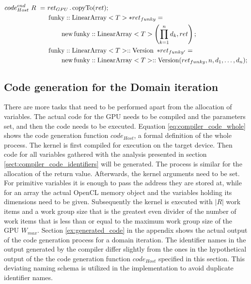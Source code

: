 \begin{align}
\label{eq:compiler_code_return_2}
code_{Host}^{end}\ R \ = 	&\ ret_{GPU}\operatorname{.copyTo}(ret);\\
				 	&\ \operatorname{funky}::\operatorname{LinearArray}<T> *ret_{funky} = \notag\\
				 	&\ \qquad \operatorname{new} \operatorname{funky}::\operatorname{LinearArray}<T>\left(\prod_{k=1}^n d_k,ret\right); \notag\\
            		&\ \operatorname{funky}::\operatorname{LinearArray}<T>::\operatorname{Version}\ * ret_{funky'} = \notag\\
            		&\ \qquad \operatorname{new} \operatorname{funky}::\operatorname{LinearArray}<T>::\operatorname{Version}(ret_{funky},n,d_1,\dotsc, d_n); \notag
\end{align}

\subsection{Code generation for the Domain iteration}
\label{sect:compiler_code_program}
There are more tasks that need to be performed apart from the allocation of variables. The actual code for the GPU needs to be compiled and the parameters set, and then the code needs to be executed. Equation \ref{eq:compiler_code_whole} shows the code generation function $code_{Host}$, a formal definition of the whole process. The kernel is first compiled for execution on the target device. Then code for all variables gathered with the analysis presented in section \ref{sect:compiler_code_identifiers} will be generated. The process is similar for the allocation of the return value. Afterwards, the kernel arguments need to be set. For primitive variables it is enough to pass the address they are stored at, while for an array the actual OpenCL memory object and the variables holding its dimensions need to be given. Subsequently the kernel is executed with $|R|$ work items and a work group size that is the greatest even divider of the number of work items that is less than or equal to the maximum work group size of the GPU $W_{max}$. Section \ref{ex:generated_code} in the appendix shows the actual output of the code generation process for a domain iteration. The identifier names in the output generated by the compiler differ slightly from the ones in the hypothetical output of the the code generation function $code_{Host}$ specified in this section. This deviating naming schema is utilized in the implementation to avoid duplicate identifier names. \\ %

